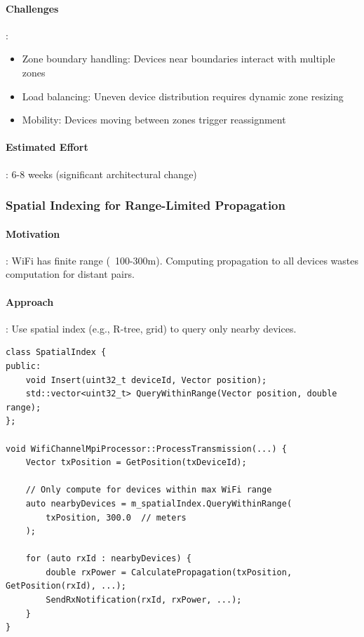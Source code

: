 \paragraph{Challenges}:
\begin{itemize}
    \item Zone boundary handling: Devices near boundaries interact with multiple zones
    \item Load balancing: Uneven device distribution requires dynamic zone resizing
    \item Mobility: Devices moving between zones trigger reassignment
\end{itemize}

\paragraph{Estimated Effort}: 6-8 weeks (significant architectural change)

\subsubsection{Spatial Indexing for Range-Limited Propagation}

\paragraph{Motivation}:
WiFi has finite range (~100-300m). Computing propagation to all devices wastes computation for distant pairs.

\paragraph{Approach}:
Use spatial index (e.g., R-tree, grid) to query only nearby devices.

\begin{lstlisting}[style=cpp]
class SpatialIndex {
public:
    void Insert(uint32_t deviceId, Vector position);
    std::vector<uint32_t> QueryWithinRange(Vector position, double range);
};

void WifiChannelMpiProcessor::ProcessTransmission(...) {
    Vector txPosition = GetPosition(txDeviceId);
    
    // Only compute for devices within max WiFi range
    auto nearbyDevices = m_spatialIndex.QueryWithinRange(
        txPosition, 300.0  // meters
    );
    
    for (auto rxId : nearbyDevices) {
        double rxPower = CalculatePropagation(txPosition, GetPosition(rxId), ...);
        SendRxNotification(rxId, rxPower, ...);
    }
}
\end{lstlisting}

